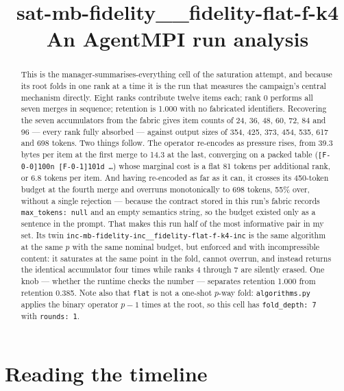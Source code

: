 \documentclass[11pt]{article}
\title{\textbf{sat-mb-fidelity\_\_fidelity-flat-f-k4}\\[2pt]\large An AgentMPI run analysis}
\author{}
\date{}
\begin{document}
\maketitle

\begin{abstract}
This is the manager-summarises-everything cell of the saturation attempt, and because its
root folds in one rank at a time it is the run that measures the campaign's central
mechanism directly. Eight ranks contribute twelve items each; rank 0 performs all seven
merges in sequence; retention is 1.000 with no fabricated identifiers. Recovering the seven
accumulators from the fabric gives item counts of 24, 36, 48, 60, 72, 84 and 96 --- every
rank fully absorbed --- against output sizes of 354, 425, 373, 454, 535, 617 and 698
tokens. Two things follow. The operator re-encodes as pressure rises, from 39.3 bytes per
item at the first merge to 14.3 at the last, converging on a packed table
(\texttt{[F-0-0]100n [F-0-1]101d \dots}) whose marginal cost is a flat 81 tokens per
additional rank, or 6.8 tokens per item. And having re-encoded as far as it can, it crosses
its 450-token budget at the fourth merge and overruns monotonically to 698 tokens, 55\%
over, without a single rejection --- because the contract stored in this run's fabric
records \texttt{max\_tokens: null} and an empty semantics string, so the budget existed only
as a sentence in the prompt. That makes this run half of the most informative pair in my
set. Its twin \texttt{inc-mb-fidelity-inc\_\_fidelity-flat-f-k4-inc} is the same algorithm
at the same $p$ with the same nominal budget, but enforced and with incompressible content:
it saturates at the same point in the fold, cannot overrun, and instead returns the
identical accumulator four times while ranks 4 through 7 are silently erased. One knob ---
whether the runtime checks the number --- separates retention 1.000 from retention 0.385.
Note also that \texttt{flat} is not a one-shot $p$-way fold: \texttt{algorithms.py} applies
the binary operator $p-1$ times at the root, so this cell has \texttt{fold\_depth: 7} with
\texttt{rounds: 1}.
\end{abstract}



\section{Reading the timeline}
\end{document}
